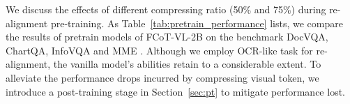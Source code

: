 We discuss the effects of different compressing ratio (50\% and 75\%) during re-alignment pre-training. 
As Table~\ref{tab:pretrain_performance}
lists, we compare the results of pretrain models of FCoT-VL-2B on the benchmark
DocVQA, ChartQA, InfoVQA and MME \cite{fu2024mmecomprehensiveevaluationbenchmark}. Although we employ OCR-like task for re-alignment, the vanilla model's abilities retain to a considerable extent. 
To alleviate the performance drops incurred by compressing visual token, we introduce a post-training stage in Section~\ref{sec:pt} to mitigate performance lost.




